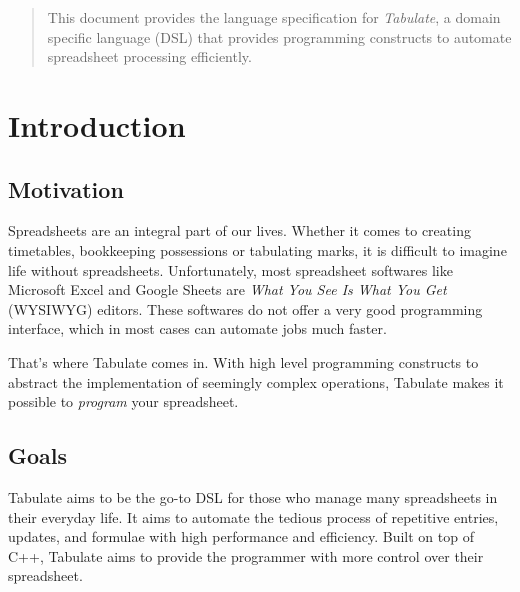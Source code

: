 \documentclass[conference,compsoc]{IEEEtran}
\begin{document}
\maketitle
\tableofcontents
\vspace{3mm}
\begin{abstract}
This document provides the language specification for \emph{Tabulate}, a domain
specific language (DSL) that provides programming constructs to automate
spreadsheet processing efficiently.  
\end{abstract}





%
\IEEEpeerreviewmaketitle

\section{Introduction}

\subsection{Motivation}
Spreadsheets are an integral part of our lives. Whether it comes to creating
timetables, bookkeeping possessions or tabulating marks, it is difficult to
imagine life without spreadsheets. Unfortunately, most spreadsheet softwares
like Microsoft Excel and Google Sheets are \emph{What You See Is What You Get}
(WYSIWYG) editors. These softwares do not offer a very good programming
interface, which in most cases can automate jobs much faster.

That's where Tabulate comes in. With high level programming constructs to abstract
the implementation of seemingly complex operations, Tabulate makes it possible to
\emph{program} your spreadsheet.

\subsection{Goals}
Tabulate aims to be the go-to DSL for those who manage many spreadsheets in their
everyday life. It aims to automate the tedious process of repetitive entries,
updates, and formulae with high performance and efficiency. Built on top of C++,
Tabulate aims to provide the programmer with more control over their spreadsheet.
\end{document}
